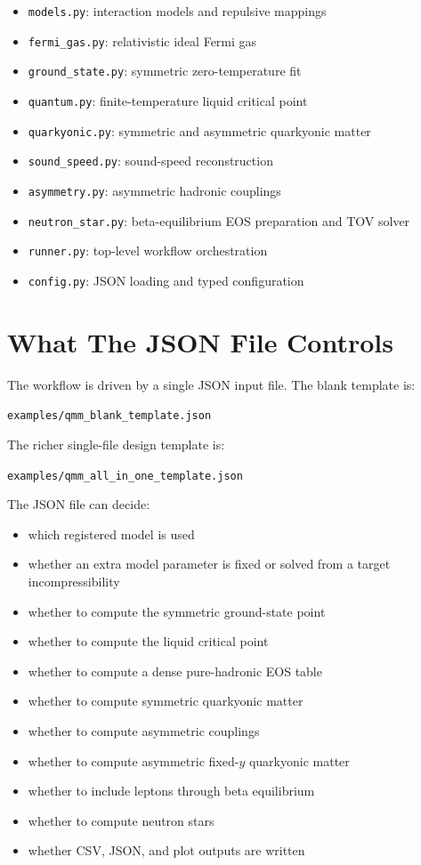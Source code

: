 \documentclass[11pt]{article}
\begin{document}
\begin{itemize}
\item \texttt{models.py}: interaction models and repulsive mappings
\item \texttt{fermi\_gas.py}: relativistic ideal Fermi gas
\item \texttt{ground\_state.py}: symmetric zero-temperature fit
\item \texttt{quantum.py}: finite-temperature liquid critical point
\item \texttt{quarkyonic.py}: symmetric and asymmetric quarkyonic matter
\item \texttt{sound\_speed.py}: sound-speed reconstruction
\item \texttt{asymmetry.py}: asymmetric hadronic couplings
\item \texttt{neutron\_star.py}: beta-equilibrium EOS preparation and TOV solver
\item \texttt{runner.py}: top-level workflow orchestration
\item \texttt{config.py}: JSON loading and typed configuration
\end{itemize}

\section{What The JSON File Controls}

The workflow is driven by a single JSON input file.  The blank template is:

\begin{center}
\texttt{examples/qmm\_blank\_template.json}
\end{center}

The richer single-file design template is:

\begin{center}
\texttt{examples/qmm\_all\_in\_one\_template.json}
\end{center}

The JSON file can decide:

\begin{itemize}
\item which registered model is used
\item whether an extra model parameter is fixed or solved from a target
incompressibility
\item whether to compute the symmetric ground-state point
\item whether to compute the liquid critical point
\item whether to compute a dense pure-hadronic EOS table
\item whether to compute symmetric quarkyonic matter
\item whether to compute asymmetric couplings
\item whether to compute asymmetric fixed-$y$ quarkyonic matter
\item whether to include leptons through beta equilibrium
\item whether to compute neutron stars
\item whether CSV, JSON, and plot outputs are written
\end{itemize}
\end{document}
